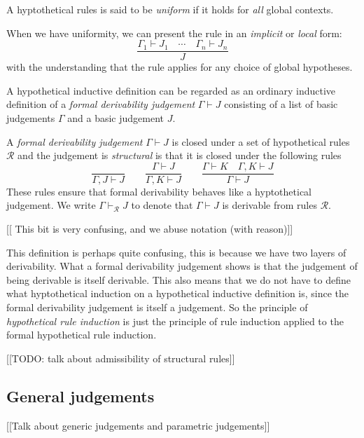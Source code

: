 \begin{defin}
    A hyptothetical rules is said to be \emph{uniform} if it holds for \emph{all} global contexts.
\end{defin}

\begin{remark}
    When we have uniformity, we can present the rule in an \emph{implicit} or \emph{local} form:
    $$
        \frac{\Gamma_1 \vdash J_1 \quad \cdots \quad \Gamma_n \vdash J_n}{J}
    $$
    with the understanding that the rule applies for any choice of global hypotheses.
\end{remark}

\begin{remark}
    A hypothetical inductive definition can be regarded as an ordinary inductive definition of a \emph{formal derivability judgement} $\Gamma \vdash J$ consisting of a list of basic judgements $\Gamma$ and a basic judgement $J$.
\end{remark}

\begin{defin}
    A \emph{formal derivability judgement} $\Gamma \vdash J$ is closed under a set of hypothetical rules $\mathcal{R}$ and the judgement is \emph{structural} is that it is closed under the following rules
    $$
        \frac{}{\Gamma, J \vdash J} \qquad
        \frac{\Gamma \vdash J}{\Gamma , K \vdash J} \qquad
        \frac{\Gamma \vdash K \quad \Gamma , K \vdash J}{\Gamma \vdash J}
    $$
    These rules ensure that formal derivability behaves like a hyptothetical judgement. We write $\Gamma \vdash_{\mathcal{R}} J$ to denote that $\Gamma \vdash J$ is derivable from rules $\mathcal{R}$.
\end{defin}

[[ This bit is very confusing, and we abuse notation (with reason)]]
\begin{remark}
    This definition is perhaps quite confusing, this is because we have two layers of derivability. What a formal derivability judgement shows is that the judgement of being derivable is itself derivable. This also means that we do not have to define what hyptothetical induction on a hypothetical inductive definition is, since the formal derivability judgement is itself a judgement. So the principle of \emph{hypothetical rule induction} is just the principle of rule induction applied to the formal hypothetical rule induction.
\end{remark}

[[TODO: talk about admissibility of structural rules]]

\subsection{General judgements}

[[Talk about generic judgements and parametric judgements]]










